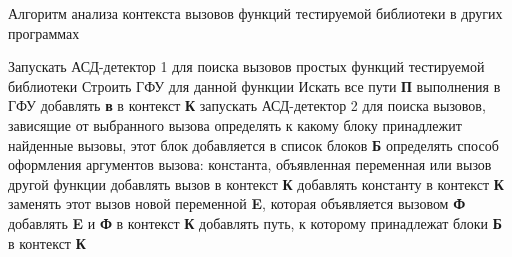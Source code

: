 \begin{algorithm}
    \caption{Алгоритм анализа контекста вызовов функций тестируемой библиотеки в других программах}\label{alg:algContextAnalysis}
    \begin{algorithmic}[1]
            \State Запускать АСД-детектор 1 для поиска вызовов простых функций тестируемой библиотеки
                \State Строить ГФУ для данной функции
                \State Искать все пути {\textbf{П}} выполнения в ГФУ
                    \State добавлять {\textbf{в}} в контекст {\textbf{К}}
                    \State запускать АСД-детектор 2 для поиска вызовов, зависящие от выбранного вызова
                            \State определять к какому блоку принадлежит найденные вызовы, этот блок добавляется в список блоков {\textbf{Б}}
                            \State определять способ оформления аргументов вызова: константа, объявленная переменная или вызов другой функции
                                \State добавлять вызов в контекст {\textbf{К}}
                            \EndIf
                                \State добавлять константу в контекст {\textbf{К}}
                            \EndIf
                                \State заменять этот вызов новой переменной {\textbf{E}}, которая объявляется вызовом {\textbf{Ф}}
                                \State добавлять {\textbf{E}} и {\textbf{Ф}} в контекст {\textbf{К}}
                            \EndIf
                        \EndFor
                        \State добавлять путь, к которому принадлежат блоки {\textbf{Б}} в контекст {\textbf{К}}
                    \EndIf
                \EndFor
            \EndIf
        \EndFunction
    \end{algorithmic}
\end{algorithm}

